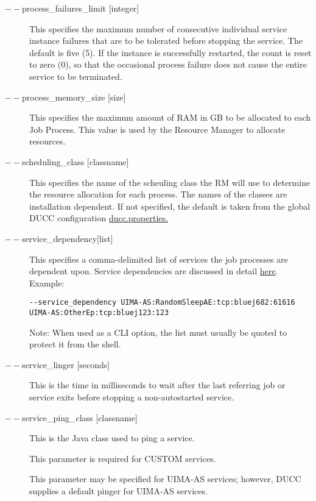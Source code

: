 \begin{description}
      \item[$--$process\_failures\_limit {[integer]}] 
        This specifies the maximum number of consecutive individual service instance failures that are to be 
        tolerated before stopping the service. The default is five (5). If the instance is successfully
        restarted, the count is reset to zero (0), so that the occasional process failure does not cause
        the entire service to be terminated.
        
      \item[$--$process\_memory\_size {[size]}] This specifies the maximum amount of RAM in GB to be
        allocated to each Job Process.  This value is used by the Resource Manager to allocate
        resources. 

      \item[$--$scheduling\_class {[classname]}] This specifies the name of the scheuling class the RM
        will use to determine the resource allocation for each process. The names of the classes are
        installation dependent. If not specified, the default is taken from the global DUCC
        configuration \hyperref[sec:ducc.properties]{ducc.properties.}

      \item[$--$service\_dependency{[list]}] This specifies a comma-delimited list of services the job
        processes are dependent upon. Service dependencies are discussed in detail
        \hyperref[sec:service.endpoints]{here}. Example:
\begin{verbatim}
--service_dependency UIMA-AS:RandomSleepAE:tcp:bluej682:61616 UIMA-AS:OtherEp:tcp:bluej123:123 
\end{verbatim}

        Note: When used as a CLI option, the list must usually be
        quoted to protect it from the shell.
          

      \item[$--$service\_linger {[seconds]}] This is the time in milliseconds to wait after the last
        referring job or service exits before stopping a non-autostarted service.

      \item[$--$service\_ping\_class {[classname]}] This is the Java class used to ping a service. 

        This parameter is required for CUSTOM services.

        This parameter may be specified for UIMA-AS services; however, DUCC supplies a default
        pinger for UIMA-AS services.


\end{description}
